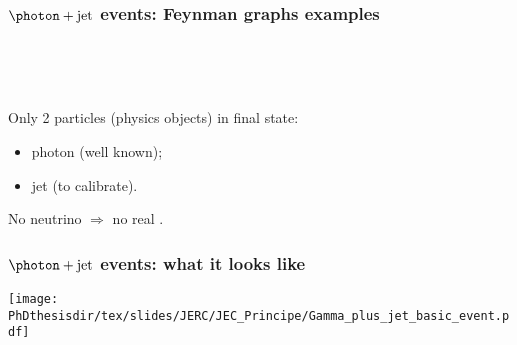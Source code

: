 \begin{frame}
\frametitle{$\photon+\text{jet}$ events: Feynman graphs examples}
~\hfill

\hfill\hfill\hfill

\hfill\hfill\hfill

\hfill~

\pause
\vfill

\manip Only 2 \og particles \fg{} (physics objects) in final state:
\begin{itemize}
\item photon (well known);
\item jet (to calibrate).
\end{itemize}
\manip No neutrino $\Rightarrow$ no real \MET.
\end{frame}

\begin{frame}
\frametitle{$\photon+\text{jet}$ events: what it looks like}
\begin{center}
\texttt{[image: \\PhDthesisdir/tex/slides/JERC/JEC\_Principe/Gamma\_plus\_jet\_basic\_event.pdf]}
\end{center}
\end{frame}
